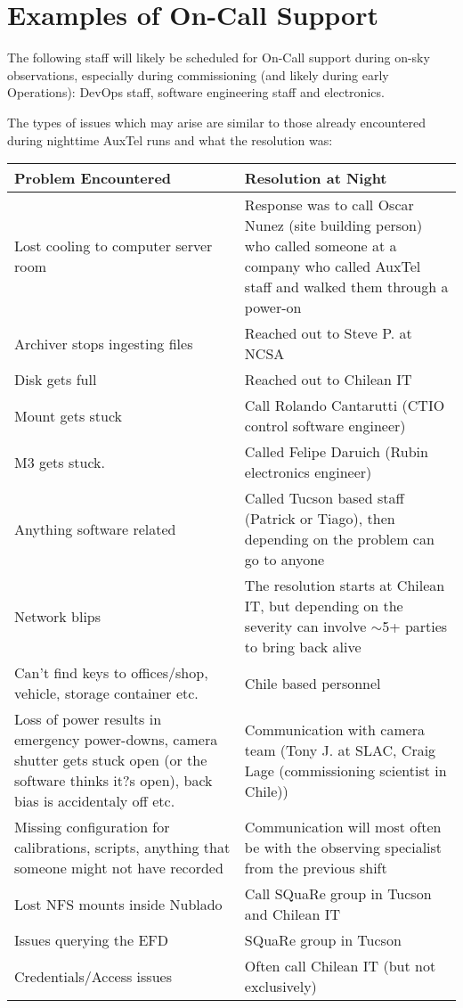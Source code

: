 \section{Examples of On-Call Support}
The following staff will likely be scheduled for On-Call support during on-sky observations, especially during commissioning (and likely during early Operations): DevOps staff, software engineering staff and electronics.

The types of issues which may arise are similar to those already encountered during nighttime AuxTel runs and what the resolution was:

\begin{longtable}{p{}p{}}\hline
\textbf{Problem Encountered} & \textbf{Resolution at Night}  \\\hline

Lost cooling to computer server room &  Response was to call Oscar Nunez (site building person) who called someone at a company who called AuxTel staff and walked them through a power-on    \\\hline
Archiver stops ingesting files   &  Reached out to Steve P. at NCSA   \\\hline
Disk gets full  &   Reached out to Chilean IT  \\\hline
Mount gets stuck  &   Call Rolando Cantarutti (CTIO control software engineer)   \\\hline
M3 gets stuck.  &  Called Felipe Daruich (Rubin electronics engineer)   \\\hline
Anything software related   &   Called Tucson based staff (Patrick or Tiago), then depending on the problem can go to anyone  \\\hline
Network blips   &   The resolution starts at Chilean IT, but depending on the severity can involve $\sim$5+ parties to bring back alive   \\\hline
Can't find keys to offices/shop, vehicle, storage container etc.  &   Chile based personnel      \\\hline
Loss of power results in emergency power-downs, camera shutter gets stuck open (or the software thinks it?s open), back bias is accidentaly off etc. & Communication with camera team (Tony J. at SLAC, Craig Lage (commissioning scientist in Chile))     \\\hline
Missing configuration for calibrations, scripts, anything that someone might not have recorded &   Communication will most often be with the observing specialist from the previous shift   \\\hline
Lost NFS mounts inside Nublado & Call SQuaRe group in Tucson and Chilean IT     \\\hline
Issues querying the EFD   &  SQuaRe group in Tucson   \\\hline
Credentials/Access issues  &   Often call Chilean IT (but not exclusively)  \\\hline

\end{longtable}


